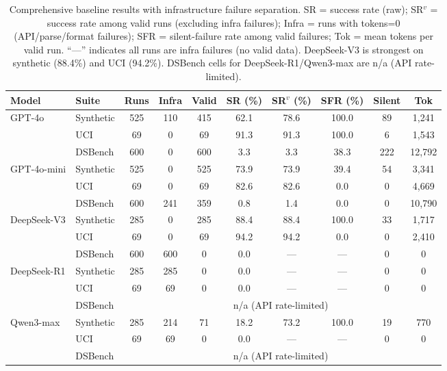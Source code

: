 \begin{table}[t]
\centering
\caption{Comprehensive baseline results with infrastructure failure separation. SR = success rate (raw); SR$^v$ = success rate among valid runs (excluding infra failures); Infra = runs with tokens=0 (API/parse/format failures); SFR = silent-failure rate among valid failures; Tok = mean tokens per valid run. ``---'' indicates all runs are infra failures (no valid data). DeepSeek-V3 is strongest on synthetic (88.4\%) and UCI (94.2\%). DSBench cells for DeepSeek-R1/Qwen3-max are n/a (API rate-limited).}
\label{tab:comprehensive}
\small
\begin{tabular}{@{}llcccccccc@{}}
\toprule
Model & Suite & Runs & Infra & Valid & SR (\%) & SR$^v$ (\%) & SFR (\%) & Silent & Tok \\
\midrule
\multirow{3}{*}{GPT-4o}
 & Synthetic & 525 & 110 & 415 & 62.1 & 78.6 & 100.0 & 89 & 1{,}241 \\
 & UCI & 69 & 0 & 69 & 91.3 & 91.3 & 100.0 & 6 & 1{,}543 \\
 & DSBench & 600 & 0 & 600 & 3.3 & 3.3 & 38.3 & 222 & 12{,}792 \\
\midrule
\multirow{3}{*}{GPT-4o-mini}
 & Synthetic & 525 & 0 & 525 & 73.9 & 73.9 & 39.4 & 54 & 3{,}341 \\
 & UCI & 69 & 0 & 69 & 82.6 & 82.6 & 0.0 & 0 & 4{,}669 \\
 & DSBench & 600 & 241 & 359 & 0.8 & 1.4 & 0.0 & 0 & 10{,}790 \\
\midrule
\multirow{3}{*}{DeepSeek-V3}
 & Synthetic & 285 & 0 & 285 & 88.4 & 88.4 & 100.0 & 33 & 1{,}717 \\
 & UCI & 69 & 0 & 69 & 94.2 & 94.2 & 0.0 & 0 & 2{,}410 \\
 & DSBench & 600 & 600 & 0 & 0.0 & --- & --- & 0 & 0 \\
\midrule
\multirow{3}{*}{DeepSeek-R1}
 & Synthetic & 285 & 285 & 0 & 0.0 & --- & --- & 0 & 0 \\
 & UCI & 69 & 69 & 0 & 0.0 & --- & --- & 0 & 0 \\
 & DSBench & \multicolumn{8}{c}{n/a (API rate-limited)} \\
\midrule
\multirow{3}{*}{Qwen3-max}
 & Synthetic & 285 & 214 & 71 & 18.2 & 73.2 & 100.0 & 19 & 770 \\
 & UCI & 69 & 69 & 0 & 0.0 & --- & --- & 0 & 0 \\
 & DSBench & \multicolumn{8}{c}{n/a (API rate-limited)} \\
\bottomrule
\end{tabular}
\end{table}
